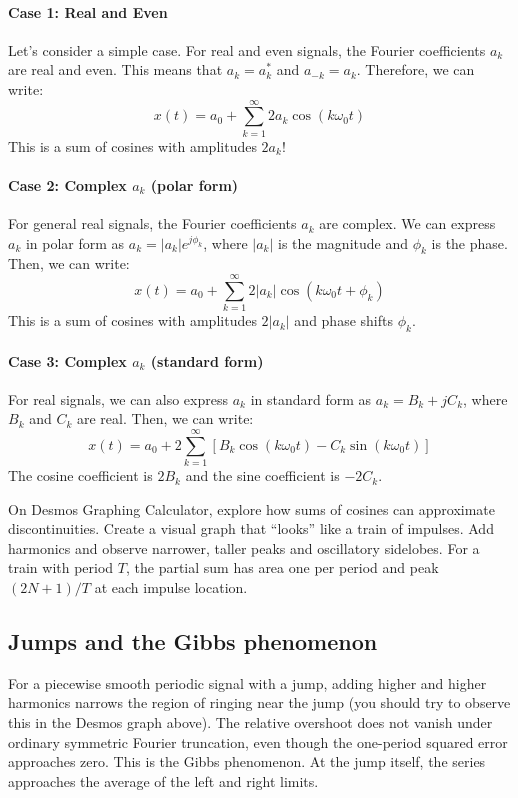 \paragraph{Case 1: Real and Even}
Let's consider a simple case. For real and even signals, the Fourier coefficients \(a_k\) are real and even. This means that \(a_k = a_k^*\) and \(a_{-k} = a_k\). Therefore, we can write:
\[
x(t) = a_0 + \sum_{k=1}^{\infty} 2 a_k \cos(k \omega_0 t)
\]
This is a sum of cosines with amplitudes \(2 a_k\)! 

\paragraph{Case 2: Complex $a_k$ (polar form)}
For general real signals, the Fourier coefficients \(a_k\) are complex. We can express \(a_k\) in polar form as \(a_k = |a_k| e^{j \phi_k}\), where \(|a_k|\) is the magnitude and \(\phi_k\) is the phase. Then, we can write:
\[
x(t) = a_0 + \sum_{k=1}^{\infty} 2 |a_k| \cos(k \omega_0 t + \phi_k)
\]
This is a sum of cosines with amplitudes \(2 |a_k|\) and phase shifts \(\phi_k\).

\paragraph{Case 3: Complex $a_k$ (standard form)} For real signals, we can also express \(a_k\) in standard form as \(a_k = B_k + j C_k\), where \(B_k\) and \(C_k\) are real. Then, we can write:
\[
x(t) = a_0 + 2\sum_{k=1}^{\infty}\left[B_k \cos(k \omega_0 t) - C_k \sin(k \omega_0 t)\right]
\]
The cosine coefficient is $2B_k$ and the sine coefficient is $-2C_k$.
    
\begin{popquiz}
On Desmos Graphing Calculator, explore how sums of cosines can approximate discontinuities. Create a visual graph that ``looks'' like a  train of impulses.
\popqsplit
Add harmonics and observe narrower, taller peaks and oscillatory sidelobes. For a train with period $T$, the partial sum has area one per period and peak $(2N+1)/T$ at each impulse location. 
\end{popquiz}

\subsection{Jumps and the Gibbs phenomenon}
For a piecewise smooth periodic signal with a jump, adding higher and higher harmonics narrows the
region of ringing near the jump (you should try to observe this in the Desmos graph above). The relative overshoot does not vanish
under ordinary symmetric Fourier truncation, even though the one-period
squared error approaches zero. This is the Gibbs phenomenon.
At the jump itself, the series approaches the average of the left and
right limits. 
